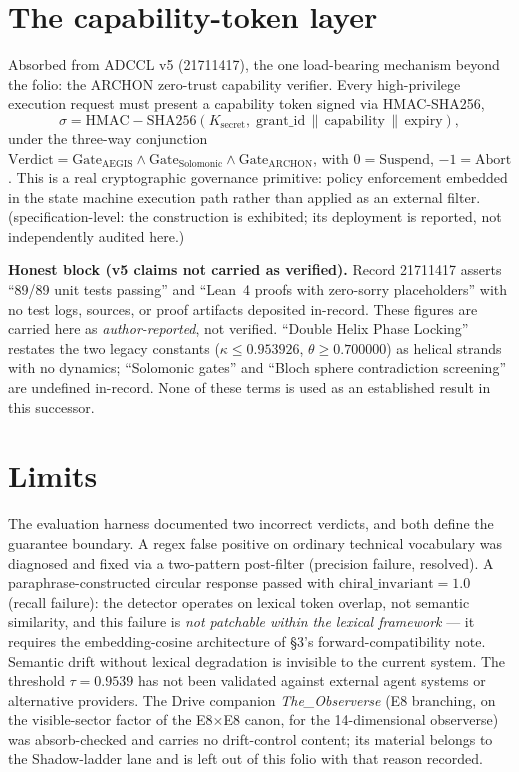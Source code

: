 \documentclass{alienfolio}
\begin{document}
\section{The capability-token layer}
Absorbed from ADCCL v5 (21711417), the one load-bearing mechanism beyond the
folio: the ARCHON zero-trust capability verifier. Every high-privilege
execution request must present a capability token signed via HMAC-SHA256,
\begin{equation}
\sigma = \mathrm{HMAC\!-\!SHA256}(K_{\mathrm{secret}},\;
\mathrm{grant\_id} \,\|\, \mathrm{capability} \,\|\, \mathrm{expiry}),
\end{equation}
under the three-way conjunction
$\mathrm{Verdict} = \mathrm{Gate}_{\mathrm{AEGIS}} \land
\mathrm{Gate}_{\mathrm{Solomonic}} \land \mathrm{Gate}_{\mathrm{ARCHON}}$,
with $0 = \mathrm{Suspend}$, $-1 = \mathrm{Abort}$. This is a real
cryptographic governance primitive: policy enforcement embedded in the state
machine execution path rather than applied as an external filter.
 (specification-level: the construction is exhibited; its
deployment is reported, not independently audited here.)

\goldrule
\textbf{Honest block (v5 claims not carried as verified).} Record 21711417
asserts ``89/89 unit tests passing'' and ``Lean~4 proofs with zero-sorry
placeholders'' with no test logs, sources, or proof artifacts deposited
in-record. These figures are carried here as \emph{author-reported}, not
verified. ``Double Helix Phase Locking'' restates the two legacy constants
($\kappa \leq 0.953926$, $\theta \geq 0.700000$) as helical strands with no
dynamics; ``Solomonic gates'' and ``Bloch sphere contradiction screening''
are undefined in-record. None of these terms is used as an established
result in this successor.

\section{Limits}
The evaluation harness documented two incorrect verdicts, and both define the
guarantee boundary. A regex false positive on ordinary technical vocabulary
was diagnosed and fixed via a two-pattern post-filter (precision failure,
resolved). A paraphrase-constructed circular response passed with
$\mathrm{chiral\_invariant} = 1.0$ (recall failure): the detector operates on
lexical token overlap, not semantic similarity, and this failure is
\emph{not patchable within the lexical framework} --- it requires the
embedding-cosine architecture of \S3's forward-compatibility note. Semantic
drift without lexical degradation is invisible to the current system. The
threshold $\tau = 0.9539$ has not been validated against external agent
systems or alternative providers. The Drive companion
\emph{The\_Observerse} (E8 branching, on the visible-sector factor of the E8$\times$E8 canon, for the 14-dimensional observerse) was
absorb-checked and carries no drift-control content; its material belongs to
the Shadow-ladder lane and is left out of this folio with that reason
recorded.
\end{document}
